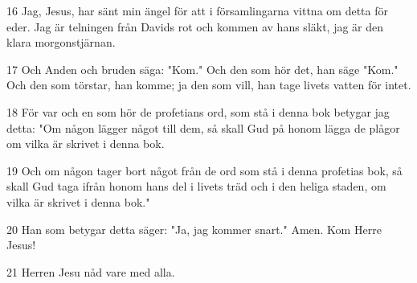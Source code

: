 \par 16 Jag, Jesus, har sänt min ängel för att i församlingarna vittna om detta för eder. Jag är telningen från Davids rot och kommen av hans släkt, jag är den klara morgonstjärnan.
\par 17 Och Anden och bruden säga: "Kom." Och den som hör det, han säge "Kom." Och den som törstar, han komme; ja den som vill, han tage livets vatten för intet.
\par 18 För var och en som hör de profetians ord, som stå i denna bok betygar jag detta: "Om någon lägger något till dem, så skall Gud på honom lägga de plågor om vilka är skrivet i denna bok.
\par 19 Och om någon tager bort något från de ord som stå i denna profetias bok, så skall Gud taga ifrån honom hans del i livets träd och i den heliga staden, om vilka är skrivet i denna bok."
\par 20 Han som betygar detta säger: "Ja, jag kommer snart." Amen. Kom Herre Jesus!
\par 21 Herren Jesu nåd vare med alla.


